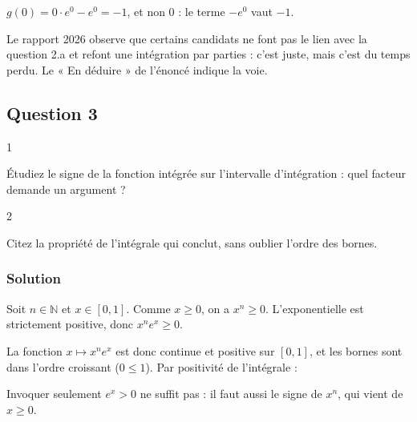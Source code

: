 \documentclass[11pt,a4paper]{article}
\newcommand{\equationajustee}[1]{%
  \sbox{\boiteequation}{$\displaystyle #1$}%
  \ifdim\wd\boiteequation>\linewidth
    \[\resizebox{\linewidth}{!}{\usebox{\boiteequation}}\]%
  \else
    \[#1\]%
  \fi}
\begin{document}
\equationajustee{\boxed{I_1=1}}

\begin{piege}

\(g(0)=0\cdot e^0-e^0=-1\), et non \(0\) : le terme \(-e^0\) vaut \(-1\).

\end{piege}

\begin{jury}

Le rapport 2026 observe que certains candidats ne font pas le lien avec la question 2.a et refont une intégration par parties : c'est juste, mais c'est du temps perdu. Le « En déduire » de l'énoncé indique la voie.

\end{jury}

\hypertarget{question-3}{%
\subsection{Question 3}\label{question-3}}

\begin{indication}{1}

Étudiez le signe de la fonction intégrée sur l'intervalle d'intégration : quel facteur demande un argument ?

\end{indication}

\begin{indication}{2}

Citez la propriété de l'intégrale qui conclut, sans oublier l'ordre des bornes.

\end{indication}

\hypertarget{solution-13}{%
\subsubsection{Solution}\label{solution-13}}

Soit \(n\in\mathbb N\) et \(x\in[0,1]\). Comme \(x\ge0\), on a \(x^n\ge0\). L'exponentielle est strictement positive, donc \(x^ne^x\ge0\).

La fonction \(x\mapsto x^ne^x\) est donc continue et positive sur \([0,1]\), et les bornes sont dans l'ordre croissant (\(0\le1\)). Par positivité de l'intégrale :

\equationajustee{\boxed{\forall n\in\mathbb N,\quad I_n\ge0.}}

\begin{piege}

Invoquer seulement \(e^x>0\) ne suffit pas : il faut aussi le signe de \(x^n\), qui vient de \(x\ge0\).

\end{piege}
\end{document}
